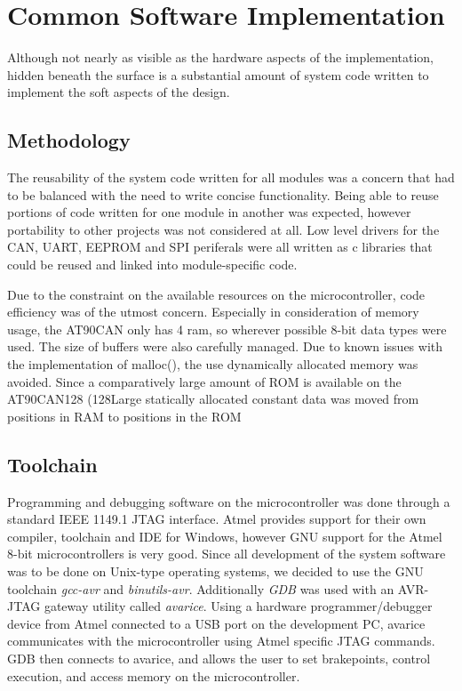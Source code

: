 \section{Common Software Implementation\label{sec:common_software_implementation}}

Although not nearly as visible as the hardware aspects of the implementation, hidden beneath the surface is a substantial amount of system code written to implement the soft aspects of the design.

\subsection{Methodology}

The reusability of the system code written for all modules was a concern that had to be balanced with the need to write concise functionality. Being able to reuse portions of code written for one module in another was expected, however portability to other projects was not considered at all. Low level drivers for the CAN, UART, EEPROM and SPI periferals were all written as c libraries that could be reused and linked into module-specific code.

Due to the constraint on the available resources on the microcontroller, code efficiency was of the utmost concern. Especially in consideration of memory usage, the AT90CAN only has \unit{4}{\kilo\byte} ram, so wherever possible 8-bit data types were used. The size of buffers were also carefully managed. Due to known issues with the implementation of malloc(), the use dynamically allocated memory was avoided. Since a comparatively large amount of ROM is available on the AT90CAN128 (\unit{128}{\kilo\byte}Large statically allocated constant data was moved from positions in RAM to positions in the ROM

\subsection{Toolchain}

Programming and debugging software on the microcontroller was done through a standard IEEE 1149.1 JTAG interface. Atmel provides support for their own compiler, toolchain and IDE for Windows, however GNU support for the Atmel 8-bit microcontrollers is very good. Since all development of the system software was to be done on Unix-type operating systems, we decided to use the GNU toolchain \emph{gcc-avr} and \emph{binutils-avr}. Additionally \emph{GDB} was used with an AVR-JTAG gateway utility called \emph{avarice}. Using a hardware programmer/debugger device from Atmel connected to a USB port on the development PC, avarice communicates with the microcontroller using Atmel specific JTAG commands. GDB then connects to avarice, and allows the user to set brakepoints, control execution, and access memory on the microcontroller.

